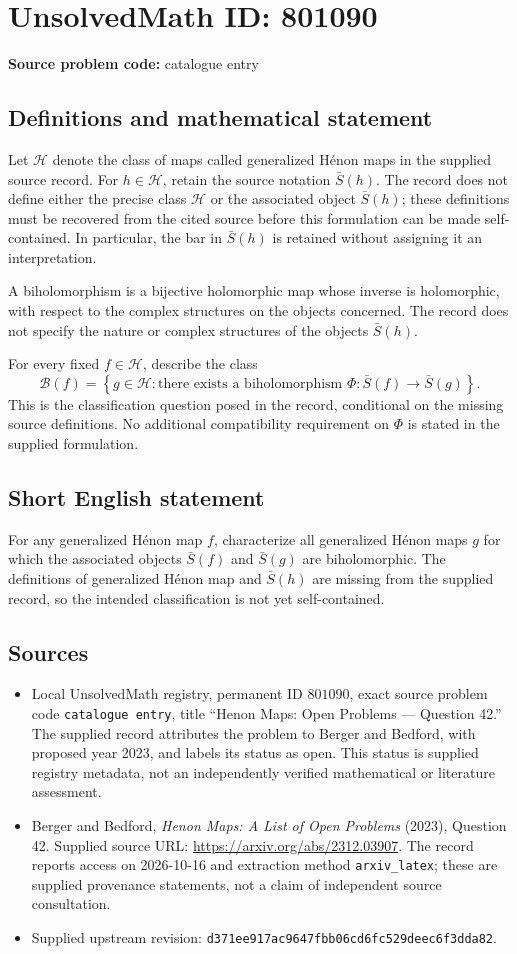 \documentclass[11pt]{article}
\begin{document}
\section*{UnsolvedMath ID: 801090}
\textbf{Source problem code:} catalogue entry
\subsection{Definitions and mathematical statement}
Let \(\mathcal H\) denote the class of maps called generalized H\'enon maps in the supplied source record. For \(h\in\mathcal H\), retain the source notation \(\bar S(h)\). The record does not define either the precise class \(\mathcal H\) or the associated object \(\bar S(h)\); these definitions must be recovered from the cited source before this formulation can be made self-contained. In particular, the bar in \(\bar S(h)\) is retained without assigning it an interpretation.

A biholomorphism is a bijective holomorphic map whose inverse is holomorphic, with respect to the complex structures on the objects concerned. The record does not specify the nature or complex structures of the objects \(\bar S(h)\).

For every fixed \(f\in\mathcal H\), describe the class
\[
\mathcal B(f)=\left\{g\in\mathcal H:\text{there exists a biholomorphism }\Phi:\bar S(f)\longrightarrow\bar S(g)\right\}.
\]
This is the classification question posed in the record, conditional on the missing source definitions. No additional compatibility requirement on \(\Phi\) is stated in the supplied formulation.
\subsection{Short English statement}
For any generalized H\'enon map \(f\), characterize all generalized H\'enon maps \(g\) for which the associated objects \(\bar S(f)\) and \(\bar S(g)\) are biholomorphic. The definitions of generalized H\'enon map and \(\bar S(h)\) are missing from the supplied record, so the intended classification is not yet self-contained.
\subsection{Sources}
\begin{itemize}
\item Local UnsolvedMath registry, permanent ID \(801090\), exact source problem code \texttt{catalogue entry}, title ``Henon Maps: Open Problems --- Question 42.'' The supplied record attributes the problem to Berger and Bedford, with proposed year 2023, and labels its status as open. This status is supplied registry metadata, not an independently verified mathematical or literature assessment.
\item Berger and Bedford, \emph{Henon Maps: A List of Open Problems} (2023), Question 42. Supplied source URL: \url{https://arxiv.org/abs/2312.03907}. The record reports access on 2026-10-16 and extraction method \texttt{arxiv\_latex}; these are supplied provenance statements, not a claim of independent source consultation.
\item Supplied upstream revision: \texttt{d371ee917ac9647fbb06cd6fc529deec6f3dda82}.
\end{itemize}
\end{document}
